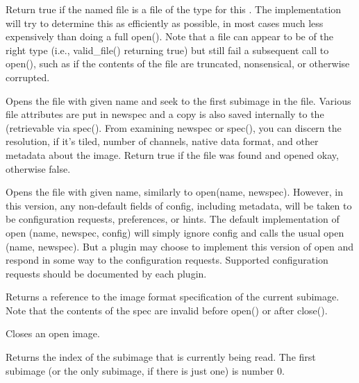 Return {\cf true} if the named file is a file of the type for this
\ImageInput.  The implementation will try to determine this as
efficiently as possible, in most cases much less expensively than doing
a full {\cf open()}.  Note that a file can appear to be of
the right type (i.e., {\cf valid_file()} returning {\cf true}) but still
fail a subsequent call to {\cf open()}, such as if the contents of the
file are truncated, nonsensical, or otherwise corrupted.
\apiend

Opens the file with given name and seek to the first subimage in the
file.  Various file attributes are put in
{\kw newspec} and a copy is also saved internally to the
\ImageInput (retrievable via {\kw spec()}.  From examining
{\kw newspec} or {\kw spec()}, you can discern the resolution, if it's
tiled, number of channels, native data format, and other metadata about
the image.  Return {\kw true} if the file was found and opened okay,
otherwise {\kw false}.
\apiend


Opens the file with given name, similarly to {\cf open(name, newspec)}.
However, in this version, any non-default fields of {\cf config},
including metadata, will be taken to be configuration requests,
preferences, or hints.  The default implementation of 
{\cf open (name, newspec, config)} will simply ignore {\cf config} and
calls the usual {\cf open (name, newspec)}.  But a plugin may choose to
implement this version of {\cf open} and respond in some way to the
configuration requests.  Supported configuration requests should be
documented by each plugin.
\apiend

Returns a reference to the image format specification of the
current subimage.  Note that the contents of the spec are
invalid before {\kw open()} or after {\kw close()}.
\apiend

Closes an open image.
\apiend


Returns the index of the subimage that is currently being read.
The first subimage (or the only subimage, if there is just one) is
number 0.
\apiend



